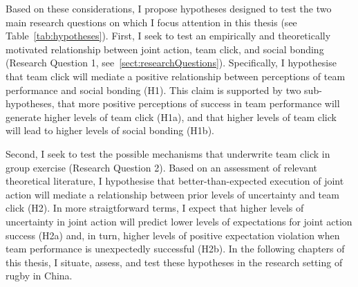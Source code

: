 \begin{CJK}{UTF8}{gbsn}
Based on these considerations, I propose hypotheses designed to test the two main research questions on which I focus attention in this thesis (see Table~\ref{tab:hypotheses}).  First, I seek to test an empirically and theoretically motivated relationship between joint action, team click, and social bonding (Research Question 1, see~\ref{sect:researchQuestions}).  Specifically, I hypothesise that team click will mediate a positive relationship between perceptions of team performance and social bonding (H1).  This claim is supported by two sub-hypotheses, that more positive perceptions of success in team performance will generate higher levels of team click (H1a), and that
higher levels of team click will lead to higher levels of social bonding (H1b).

Second, I seek to test the possible mechanisms that underwrite team click in group exercise (Research Question 2).  Based on an assessment of relevant theoretical literature, I hypothesise that better-than-expected execution of joint action will mediate a relationship between prior levels of uncertainty and team click (H2).  In more straigtforward terms, I expect that higher levels of uncertainty in joint action will predict lower levels of expectations for joint action success (H2a) and, in turn, higher levels of positive expectation violation when team performance is unexpectedly successful (H2b).  In the following chapters of this thesis, I situate, assess, and test these hypotheses in the research setting of rugby in China.





















\end{CJK}

